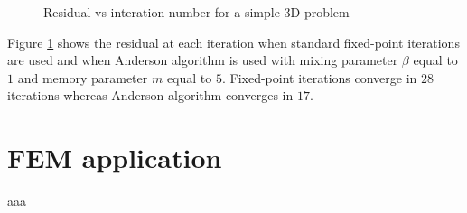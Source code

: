 \documentclass[12pt]{article}
\begin{document}
			\begin{figure}
			{\scriptsize
			}
			\centering
			\caption{Residual vs interation number for a simple 3D problem}
			\label{fig:simple}
			\end{figure}
			
			Figure \ref{fig:simple} shows the residual at each iteration when standard fixed-point iterations are used 
			and when Anderson algorithm is used with mixing parameter $\beta$ equal to $1$ and memory parameter $m$ equal to $5$.
			Fixed-point iterations converge in $28$ iterations whereas Anderson algorithm converges in $17$.

		\section{FEM application}
		\label{sec:FEM}
			aaa

		\pagebreak			
			\printbibliography[heading=bibintoc,
			title={Bibliography}]
						
					
	
\end{document}
